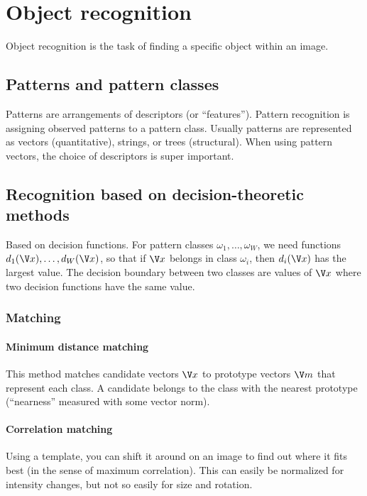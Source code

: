 \section{Object recognition}
Object recognition is the task of finding a specific object within an image.

\subsection{Patterns and pattern classes}
Patterns are arrangements of descriptors (or ``features''). Pattern recognition is assigning observed patterns to a pattern class. Usually patterns are represented as vectors (quantitative), strings, or trees (structural). When using pattern vectors, the choice of descriptors is super important.

\subsection[Decision-theoretic methods]{Recognition based on decision-theoretic methods}
Based on decision functions. For pattern classes $\omega_1, \dots, \omega_W$, we need functions $d_1(\x), \dots, d_W(\x)$, so that if $\x$ belongs in class $\omega_i$, then $d_i(\x)$ has the largest value. The decision boundary between two classes are values of $\x$ where two decision functions have the same value.

\subsubsection{Matching}

\paragraph{Minimum distance matching} This method matches candidate vectors $\x$ to prototype vectors $\m$ that represent each class. A candidate belongs to the class with the nearest prototype (``nearness'' measured with some vector norm).

\paragraph{Correlation matching}
Using a template, you can shift it around on an image to find out where it fits best (in the sense of maximum correlation). This can easily be normalized for intensity changes, but not so easily for size and rotation.

